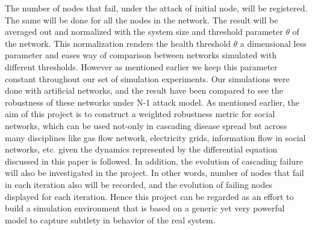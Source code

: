 \documentclass[11pt]{article}
\begin{document}
 The number of nodes that fail, under the attack of initial node, will be registered. The same will be done for all the nodes in the network. The result will be averaged out and normalized with the system size and threshold parameter $\theta$ of the network. This normalization renders the health threshold $\theta$ a dimensional less parameter and eases way of comparison between networks simulated with different thresholds. However as mentioned earlier we keep this parameter constant throughout our set of simulation experiments. Our simulations were done with artificial networks, and the result have been compared to see the robustness of these networks under N-1 attack model. As mentioned earlier, the aim of this project is to construct a weighted robustness metric for social networks, which can be used not-only in cascading disease spread but across many disciplines like gas flow network, electricity grids, information flow in social networks, etc. given the dynamics represented by the differential equation discussed in this paper is followed. In addition, the evolution of cascading failure will also be investigated in the project. In other words, number of nodes that fail in each iteration also will be recorded, and the evolution of failing nodes displayed for each iteration. Hence this project can be regarded as an effort to build a simulation environment that is based on a generic yet very powerful model to capture subtlety in behavior of the real system.
\end{document}
